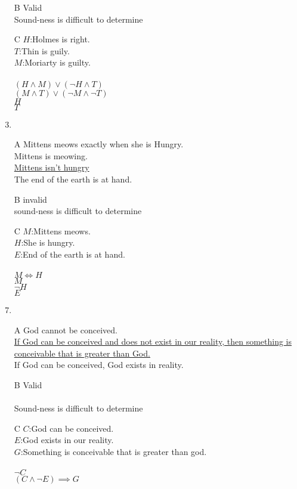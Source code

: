 \documentclass{article}
\begin{document}
\begin{enumerate}
\item[B]
Valid
\\Sound-ness is difficult to determine
\item[C]
$H$:Holmes is right.\\
$T$:Thin is guily.\\
$M$:Moriarty is guilty.\\
\\
$(H \land M)\lor(\lnot H \land T)$\\
$(M \land T)\lor(\lnot M \land \lnot T)$\\
\underline{$H$}\\
$T$
\item
\item[A]
Mittens meows exactly when she is Hungry.
\\Mittens is meowing.
\\\underline{Mittens isn't hungry}
\\The end of the earth is at hand.
\item[B]
invalid
\\sound-ness is difficult to determine
\item[C]
$M$:Mittens meows.\\
$H$:She is hungry.\\
$E$:End of the earth is at hand.\\
\\
$M \iff H$\\
$M$\\
\underline{$\lnot H$}\\
$E$
\item
\item[A]
God cannot be conceived.
\\\underline{If God can be conceived and does not exist in our reality, then something is conceivable that is greater than God.}
\\If God can be conceived, God exists in reality.
\item[B]
Valid\\
\\Sound-ness is difficult to determine
\item[C]
$C$:God can be conceived.\\
$E$:God exists in our reality.\\
$G$:Something is conceivable that is greater than god.\\
\\
$\lnot C$\\
\underline{$(C \land \lnot E)\implies G$}\\

\end{enumerate}
\end{document}
